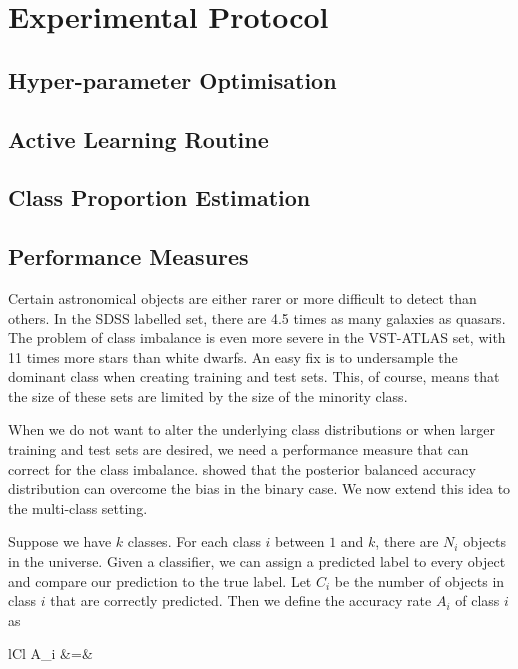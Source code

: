 
\chapter{Experimental Protocol}
\label{cha:secondexp}

\section{Hyper-parameter Optimisation}
\label{sec:why2}

\section{Active Learning Routine}
\label{sec:what2}


\section{Class Proportion Estimation}
\label{sec:what}

\section{Performance Measures}
\label{sec:measures}
Certain astronomical objects are either rarer or more difficult to detect than others.
In the SDSS labelled set, there are 4.5 times as many galaxies as quasars. The problem
of class imbalance is even more severe in the VST-ATLAS set, with 11 times more stars than
white dwarfs. An easy fix is to undersample the dominant class when creating training and
test sets. This, of course, means that the size of these sets are limited by the size
of the minority class.

When we do not want to alter the underlying class distributions or when larger training and test
sets are desired, we need a performance measure that can correct for the class imbalance.
 showed that the posterior balanced accuracy distribution can overcome
the bias in the binary case. We now extend this idea to the multi-class setting.

Suppose we have $k$ classes. For each class $i$ between $1$ and $k$, there are $N_i$ objects
in the universe. Given a classifier, we can assign a predicted label to every object and
compare our prediction to the true label. Let $C_i$ be the number of objects in class $i$
that are correctly predicted. Then we define the accuracy rate $A_i$ of class $i$ as
	\begin{IEEEeqnarray*}{lCl}
		A_i &=& 
	\end{IEEEeqnarray*}

